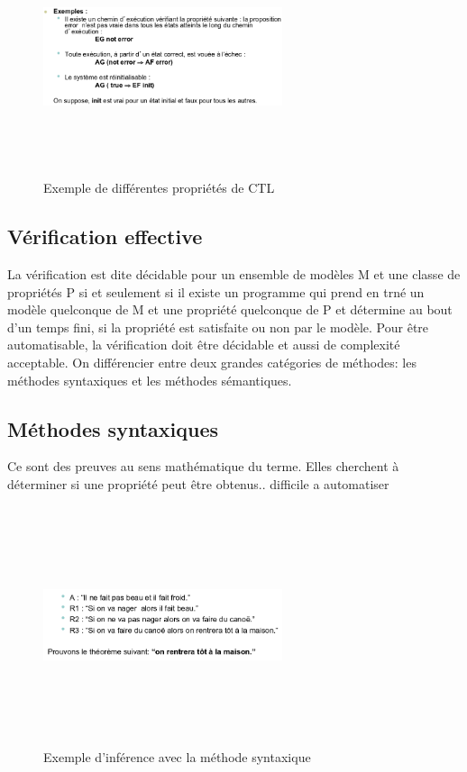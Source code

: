 \documentclass[oneside]{book}
\begin{document}
    \begin{figure}[!ht]
    	\centering
    	\includegraphics[width = 7cm, height = 7cm, keepaspectratio]{Images/exemple_ctl.png}
    	\caption{Exemple de différentes propriétés de CTL}
    	\label{fig:CTL}
    \end{figure}
    
    
    \subsection{Vérification effective}
    La vérification est dite décidable pour un ensemble de modèles M et une classe de propriétés P si et seulement si il existe un programme qui prend en trné un modèle quelconque de M et une propriété quelconque de P et détermine au bout d'un temps fini, si la propriété est satisfaite ou non par le modèle. Pour être automatisable, la vérification doit être décidable et aussi de complexité acceptable. On différencier entre deux grandes catégories de méthodes: les méthodes syntaxiques et les méthodes sémantiques.\\
    
    \subsection{Méthodes syntaxiques}
    Ce sont des preuves au sens mathématique du terme. Elles cherchent à déterminer si une propriété peut être obtenus.. difficile a automatiser\\
    
    \begin{figure}[!ht]
    	\centering
    	\includegraphics[width = 7cm, height = 7cm, keepaspectratio]{Images/methode_syntaxique.png}
    	\caption{Exemple d'inférence avec la méthode syntaxique}
    	\label{fig:MethodeSyntaxique}
    \end{figure}
    
\end{document}

